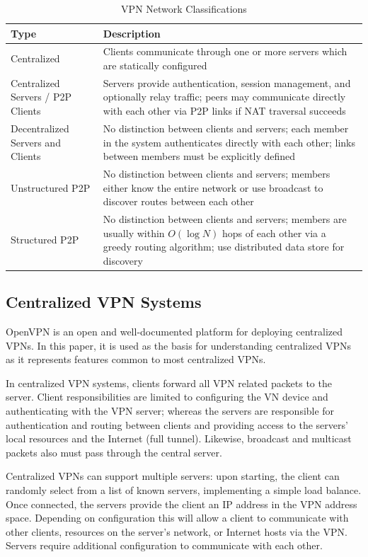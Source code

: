 \begin{center}
\begin{table}
\caption{VPN Network Classifications}
\label{tab:vpn_types}
\begin{tabular}{p{1.5in}p{4.5in}} \hline
Type & Description \\ \hline \hline
Centralized & Clients communicate through one or more servers which are statically
configured \\ \hline
Centralized Servers / P2P Clients & Servers provide authentication, session management, and
optionally relay traffic; peers may communicate directly with each
other via P2P links if NAT traversal succeeds\\ \hline
Decentralized Servers and Clients & No distinction between clients and servers;
each member in the system authenticates directly with each other; links between
members must be explicitly defined \\ \hline
Unstructured P2P & No distinction between clients and servers; members either know
the entire network or use broadcast to discover routes between each other \\ \hline
Structured P2P & No distinction between clients and servers; members are usually
within $O(\log N)$ hops of each other via a greedy routing algorithm; use
distributed data store for discovery \\ \hline
\end{tabular}
\end{table}
\end{center}


\subsection{Centralized VPN Systems}

OpenVPN is an open and well-documented platform for deploying centralized VPNs.
In this paper, it is used as the basis for understanding centralized VPNs as it
represents features common to most centralized VPNs.

In centralized VPN systems, clients forward all VPN related packets to the
server.  Client responsibilities are limited to configuring the VN device and
authenticating with the VPN server; whereas the servers are responsible for
authentication and routing between clients and providing access to the servers'
local resources and the Internet (full tunnel).  Likewise, broadcast and
multicast packets also must pass through the central server.

Centralized VPNs can support multiple servers: upon starting, the client can
randomly select from a list of known servers, implementing a simple load
balance.  Once connected, the servers provide the client an IP address in the
VPN address space. Depending on configuration this will allow a client to
communicate with other clients, resources on the server's network, or Internet
hosts via the VPN.  Servers require additional configuration to communicate
with each other.

